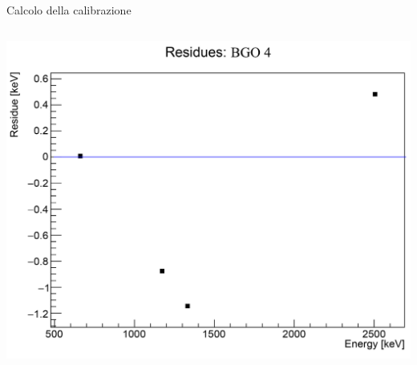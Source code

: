 \documentclass [xcolor=svgnames, 9pt] {beamer}
\begin{document}
\begin{frame}{Calcolo della calibrazione}
\begin{columns}
\begin{column}{0.43\textwidth}
				\includegraphics[width=\textwidth]{img/residues0.pdf}
		
		\end{column}
	\end{columns}
\end{frame}%
\end{document}
